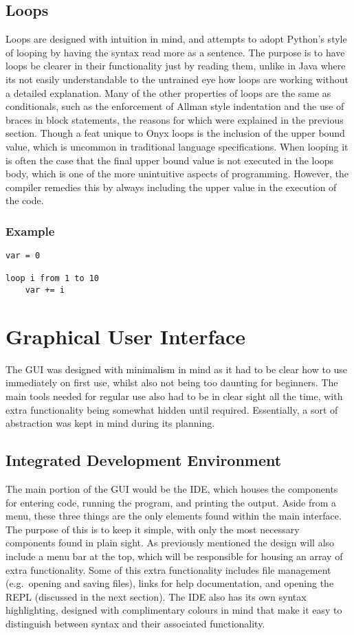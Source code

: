 \documentclass[
]{report}
\begin{document}
\subsection{Loops}
Loops are designed with intuition in mind, and attempts to adopt
Python's style of looping by having the syntax read more as a sentence.
The purpose is to have loops be clearer in their functionality just by
reading them, unlike in Java where its not easily understandable to the
untrained eye how loops are working without a detailed explanation. Many
of the other properties of loops are the same as conditionals, such as
the enforcement of Allman style indentation and the use of braces in
block statements, the reasons for which were explained in the previous
section. Though a feat unique to Onyx loops is the inclusion of the
upper bound value, which is uncommon in traditional language
specifications. When looping it is often the case that the final upper
bound value is not executed in the loops body, which is one of the more
unintuitive aspects of programming. However, the compiler remedies this
by always including the upper value in the execution of the code.

\subsubsection{Example}
\begin{verbatim}
var = 0

loop i from 1 to 10
    var += i
\end{verbatim}

\section{Graphical User Interface}
The GUI was designed with minimalism in mind as it had to be clear how
to use immediately on first use, whilst also not being too daunting for
beginners. The main tools needed for regular use also had to be in clear
sight all the time, with extra functionality being somewhat hidden until
required. Essentially, a sort of abstraction was kept in mind during its
planning.

\subsection{Integrated Development Environment}
The main portion of the GUI would be the IDE, which houses the
components for entering code, running the program, and printing the
output. Aside from a menu, these three things are the only elements
found within the main interface. The purpose of this is to keep it
simple, with only the most necessary components found in plain sight. As
previously mentioned the design will also include a menu bar at the top,
which will be responsible for housing an array of extra functionality.
Some of this extra functionality includes file management (e.g.~opening
and saving files), links for help documentation, and opening the REPL
(discussed in the next section). The IDE also has its own syntax
highlighting, designed with complimentary colours in mind that make it
easy to distinguish between syntax and their associated functionality.
\end{document}
